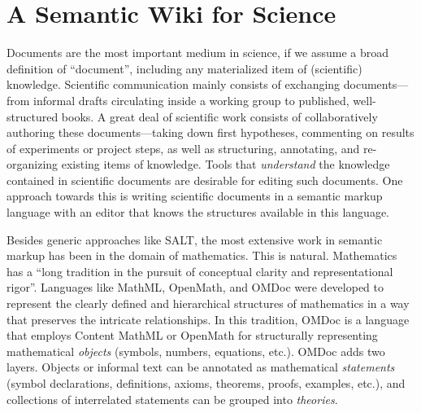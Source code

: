 \section{A Semantic Wiki for Science}
\label{sec:science}

\begin{figure}
  \centering
  \vspace{-.9cm}
  \vspace{-1.2cm}
\end{figure}
Documents are the most important medium in science, if we assume a broad definition of
``document'', including any materialized item of (scientific) knowledge.  Scientific
communication mainly consists of exchanging documents---from informal drafts circulating
inside a working group to published, well-structured books.  A great deal of scientific
work consists of collaboratively authoring these documents---taking down first hypotheses,
commenting on results of experiments or project steps, as well as structuring, annotating,
and re-organizing existing items of knowledge.  Tools that
\emph{understand} the knowledge contained in scientific documents are desirable for
editing such documents.  One approach towards this is writing scientific documents in a
semantic markup language with an editor that knows the structures available in this
language.

Besides generic approaches like SALT\cite{Groza:SALT07}, the most extensive work
in semantic markup has been in the domain of mathematics.  This is natural.
Mathematics has a ``long tradition in the pursuit of conceptual clarity and
representational rigor''\cite{Kohlhase:omdoc1.2}.  Languages like
MathML\cite{CarlisleEd:MathML07}, OpenMath\cite{BusCapCar:2oms04}, and
OMDoc\cite{Kohlhase:omdoc1.2} were developed to represent the clearly defined
and hierarchical structures of mathematics in a way that preserves the intricate
relationships.  In this tradition, OMDoc is a language that employs Content
MathML or OpenMath for structurally representing mathematical \emph{objects}
(symbols, numbers, equations, etc.).  OMDoc adds two layers.  Objects or
informal text can be annotated as mathematical \emph{statements} (symbol
declarations, definitions, axioms, theorems, proofs, examples, etc.), and
collections of interrelated statements can be grouped into \emph{theories}.

